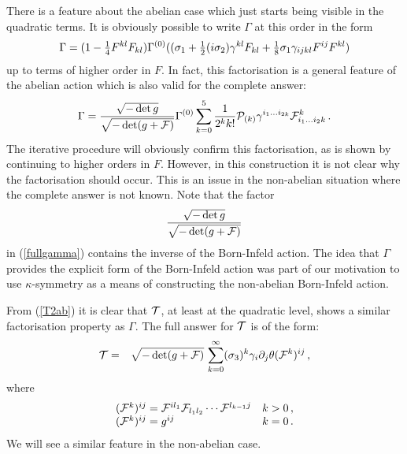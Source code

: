 \documentclass[12pt,a4paper]{article}
\def\half{{\textstyle {1 \over 2}}}
\def\quart{{\textstyle {1 \over 4}}}
\def\noverm#1#2{{\textstyle {#1 \over #2}}}
\begin{document}
There is a feature about the abelian case which
just starts being visible in
the  quadratic terms. It is obviously possible to write $\Gamma$ at
this order in the form
\begin{equation}
  \Gamma = (1 - \quart F^{kl}F_{kl})
     \Gamma^{(0)}((\sigma_1+\half(i\sigma_2)
      \gamma^{kl}F_{kl}
      +\noverm{1}{8}\sigma_1\gamma_{ijkl}F^{ij}F^{kl})
\end{equation}
up to terms of higher order in $F$. In fact, this factorisation
is a general feature
of the abelian action which is also valid for the complete answer:
\begin{equation}
\label{fullgamma}
  \Gamma = {\sqrt{-\det g}\over \sqrt{-\det(g+{\cal F})}}
     \Gamma^{(0)}
     \sum_{k=0}^5 {1\over 2^k k!} {\cal P}_{(k)} \gamma^{i_1\ldots i_{2k}}
       {\cal F}^{k}_{i_1\ldots i_2k}\,.
\end{equation}
The iterative procedure will obviously confirm this factorisation, as
is shown by continuing to higher orders in $F$. However, in this
construction it is not clear why the factorisation should occur.
This is  an issue in the non-abelian situation where the
complete answer is not known. Note that the factor
\begin{equation}
     {\sqrt{-\det g}\over \sqrt{-\det(g+{\cal F})}}
\end{equation}
in (\ref{fullgamma}) contains the inverse of the Born-Infeld action.
The idea that $\Gamma$ provides the explicit form of the
Born-Infeld action was part of our motivation to use $\kappa$-symmetry
as a means of constructing the non-abelian Born-Infeld action.

{From} (\ref{T2ab}) it is clear that ${\cal T}$, at least at the quadratic
level, shows a similar factorisation property as $\Gamma$. The full
answer for ${\cal T}$ is of the form:
\begin{eqnarray}
   {\cal T} &=& \sqrt{-\det(g+{\cal F})}\,
   \sum_{k=0}^{\infty} (\sigma_3)^k \gamma_i\partial_j\theta
      ({\cal F}^k)^{ij}\,,
\end{eqnarray}
where
\begin{equation}
\begin{array}{ll}
   ({\cal F}^k)^{ij} = {\cal F}^{il_1}
      {\cal F}_{l_1l_2}\cdots {\cal F}^{l_{k-1}j} & k>0 \,, \\
   ({\cal F}^k)^{ij}= g^{ij}                  & k=0\,.
\end{array}
\end{equation}
We will see a similar feature in the non-abelian case.
\end{document}
